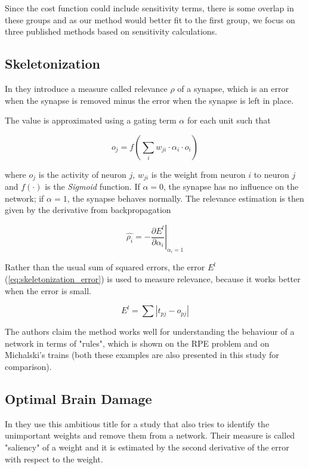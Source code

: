 Since the cost function could include sensitivity terms, there is some overlap in these groups and as our method would better fit to the first group, we focus on three published methods based on sensitivity calculations.

\subsection*{Skeletonization} \label{ssec:skeletonization}
In \citep{mozer:skeletonization} they introduce a measure called relevance $ \rho $ of a synapse, which is an error when the synapse is removed minus the error when the synapse is left in place.

The value is approximated using a gating term $ \alpha $ for each unit such that

\begin{equation}
o_j = f(\displaystyle{\sum_i w_{ji} \cdot \alpha_i \cdot o_i})
\end{equation}

where $ o_j $ is the activity of neuron $ j $, $ w_{ji} $ is the weight from neuron $ i $ to neuron $ j $ and $ f(\cdot) $ is the \textit{Sigmoid} function. If $ \alpha = 0 $, the synapse has no influence on the network; if $ \alpha = 1 $, the synapse behaves normally. The relevance estimation is then given by the derivative from backpropagation

\begin{equation}
\hat{\rho_i} = - \left.\frac{\partial E^l}{\partial \alpha_i}\right\rvert_{\alpha_i = 1}
\end{equation}

Rather than the usual sum of squared errors, the error $ E^l $ (\cref{eq:skeletonization_error}) is used to measure relevance, because it works better when the error is small.

\begin{equation} \label{eq:skeletonization_error}
E^l = \sum |t_{pj} - o_{pj}|
\end{equation}

The authors claim the method works well for understanding the behaviour of a network in terms of "rules", which is shown on the RPE problem and on Michalski's trains (both these examples are also presented in this study for comparison).

\subsection*{Optimal Brain Damage} \label{ssec:optimal_brain_damage}
In \citep{lecun:obd} they use this ambitious title for a study that also tries to identify the unimportant weights and remove them from a network. Their measure is called "saliency" of a weight and it is estimated by the second derivative of the error with respect to the weight.

